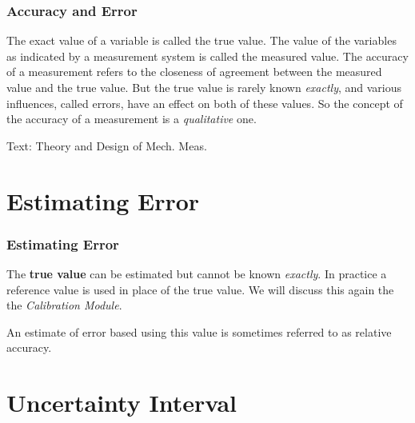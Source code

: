 \documentclass[fleqn]{beamer} %
\newcommand{\sectiontitleII}{Accuracy and Error}
\newcommand{\sectiontitleIII}{Estimating Error}
\newcommand{\sectiontitleIV}{Uncertainty Interval}
\begin{document}
\begin{frame}[label=sectionII]
\frametitle{\sectiontitleII}


The exact value of a variable is called the {\GR true value}. The value of the variables as indicated by a
measurement system is called the {\BL measured value}. The {\PR accuracy} of a measurement refers to the
closeness of agreement between the measured value and the true value. But the {\GR true value} is rarely
known {\it exactly}, and various influences, called {\RD errors}, have an effect on both of these values. So the
concept of the {\PR accuracy} of a measurement is a {\it qualitative} one. \vspcc

\begin{framed}\end{framed}

\vspace{0mm}
{\tiny Text: Theory and Design of Mech. Meas.}
\end{frame}

\section{\sectiontitleIII}

\begin{frame}[label=sectionIII]
\frametitle{\sectiontitleIII}

The {\bf \GR true value} can be estimated but cannot be known  {\it exactly}. In practice a {\BR reference} value is used in place of the true value. We will discuss this again the the {\it Calibration Module}.


\begin{framed}\end{framed}

An estimate of error based using this value is sometimes referred to as {\BL relative accuracy}. \vspc

\end{frame}

\section{\sectiontitleIV}
\end{document}
